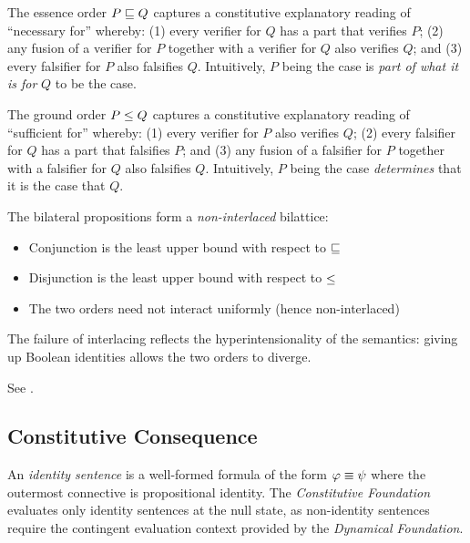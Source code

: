 \documentclass[../LogosReference.tex]{subfiles}
\begin{document}
\begin{remark}\label{rem:bilattice-orders}
  The essence order $P \sqsubseteq Q$ captures a constitutive explanatory reading of ``necessary for'' whereby: (1) every verifier for $Q$ has a part that verifies $P$; (2) any fusion of a verifier for $P$ together with a verifier for $Q$ also verifies $Q$; and (3) every falsifier for $P$ also falsifies $Q$.
  Intuitively, $P$ being the case is \textit{part of what it is for} $Q$ to be the case.

  The ground order $P \leq Q$ captures a constitutive explanatory reading of ``sufficient for'' whereby: (1) every verifier for $P$ also verifies $Q$; (2) every falsifier for $Q$ has a part that falsifies $P$; and (3) any fusion of a falsifier for $P$ together with a falsifier for $Q$ also falsifies $Q$.
  Intuitively, $P$ being the case \textit{determines} that it is the case that $Q$.
\end{remark}

\begin{remark}\label{rem:bilattice-structure}
  The bilateral propositions form a \emph{non-interlaced} bilattice:
  \begin{itemize}
    \item Conjunction is the least upper bound with respect to $\sqsubseteq$
    \item Disjunction is the least upper bound with respect to $\leq$
    \item The two orders need not interact uniformly (hence non-interlaced)
  \end{itemize}
  The failure of interlacing reflects the hyperintensionality of the semantics:
  giving up Boolean identities allows the two orders to diverge.
\end{remark}

\noindent
See .


\subsection{Constitutive Consequence}\label{sec:constitutive-consequence}

\begin{definition}\label{def:identity-sentences}
An \emph{identity sentence} is a well-formed formula of the form $\varphi \equiv \psi$ where the outermost connective is propositional identity.
The \textit{Constitutive Foundation} evaluates only identity sentences at the null state, as non-identity sentences require the contingent evaluation context provided by the \textit{Dynamical Foundation}.
\end{definition}
\end{document}

